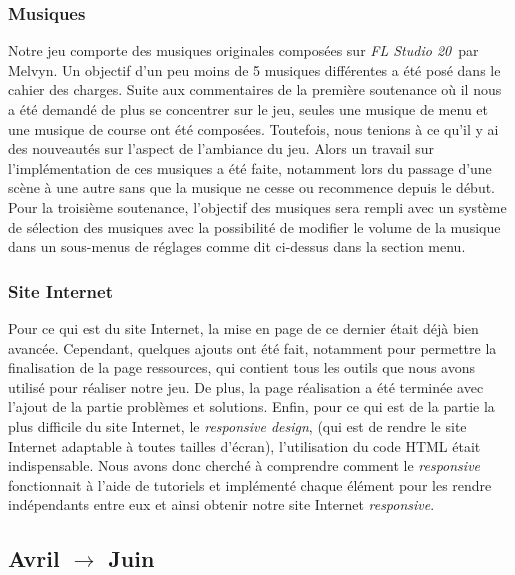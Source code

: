 \documentclass[a4paper,12pt]{article}
\newcommand{\FL}{\textsl{FL Studio 20}}
\begin{document}
            \subsubsection{Musiques}
                Notre jeu comporte des musiques originales composées sur \FL\, par Melvyn. Un objectif d'un 
                peu moins de 5 musiques différentes a été posé dans le cahier des charges. Suite aux 
                commentaires de la première soutenance où il nous a été demandé de plus se concentrer sur le
                jeu, seules une musique de menu et une musique de course ont été composées. Toutefois, nous 
                tenions à ce qu'il y ai des nouveautés sur l'aspect de l'ambiance du jeu. Alors un travail 
                sur l'implémentation de ces musiques a été faite, notamment lors du passage d'une scène à
                une autre sans que la musique ne cesse ou recommence depuis le début. Pour la troisième 
                soutenance, l'objectif des musiques sera rempli avec un système de sélection des musiques 
                avec la possibilité de modifier le volume de la musique dans un sous-menus de réglages comme
                dit ci-dessus dans la section menu.
            
            \subsubsection{Site Internet}
                Pour ce qui est du site Internet, la mise en page de ce dernier était déjà bien avancée. 
                Cependant, quelques ajouts ont été fait, notamment pour permettre la finalisation de la 
                page ressources, qui contient tous les outils que nous avons utilisé pour réaliser notre 
                jeu. De plus, la page réalisation a été terminée avec l'ajout de la partie 
                problèmes et solutions.
                Enfin, pour ce qui est de la partie la plus difficile du site Internet, le \textit{responsive 
                design}, (qui est de rendre le site Internet adaptable à toutes tailles d'écran), l'utilisation 
                du code HTML était indispensable. Nous avons donc cherché à comprendre comment le 
                \textit{responsive} fonctionnait à l'aide de tutoriels et implémenté chaque élément 
                pour les rendre indépendants entre eux et ainsi obtenir notre site Internet \textit{responsive}.
                
        \subsection{Avril $\to$ Juin}
\end{document}
